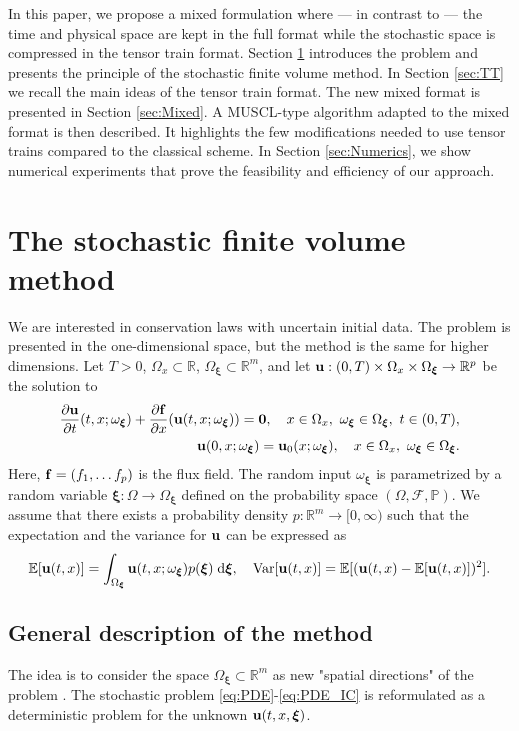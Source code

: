 \documentclass{article}
\newcommand{\bfu}{ {\bf u} }
\newcommand{\bfxi}{ {\bm \xi} }
\newcommand{\bff}{ {\bf f} }
\newcommand{\bfzero}{ {\bm 0} }
\newcommand{\R}{ \mathbb R }
\newcommand{\E}{ \mathbb E }
\newcommand{\diff}{ \; \text{d} }
\newcommand{\var}{ \text{Var} }
\begin{document}
In this paper, we propose a mixed formulation where --- in contrast to  \cite{walton_tensor-train_2024} ---  the time and physical space are kept in the full format while the stochastic space is compressed in the tensor train format.
Section \ref{sec:SFV} introduces the problem and presents the principle of the stochastic finite volume method.
In Section \ref{sec:TT} we recall the main ideas of the tensor train format.
The new mixed format is presented in Section \ref{sec:Mixed}.
A MUSCL-type algorithm adapted to the mixed format is then described. 
It highlights the few modifications needed to use tensor trains compared to the classical scheme.
In Section \ref{sec:Numerics}, we show numerical experiments that prove the feasibility and efficiency of our approach. 


\section{The stochastic finite volume method} \label{sec:SFV}
We are interested in conservation laws with uncertain initial data. 
The problem is presented in the one-dimensional space, but the method is the same for higher dimensions. 
Let $T>0$, $\Omega_x\subset\R$, $\Omega_\bfxi\subset\R^m$, 
and let $\bfu:(0,T)\times\Omega_x\times\Omega_\bfxi\to\mathbb{R}^p$ be the solution to 
\begin{align}  
    \label{eq:PDE}
    \frac{\partial \bfu }{\partial t}(t,x; \omega_\bfxi)
    + \frac{\partial \bff}{\partial x} (\bfu (t,x; \omega_\bfxi))
    = \bfzero, \quad x \in \Omega_x, \ \omega_\bfxi \in \Omega_\bfxi, \ t \in (0,T),
    \\
    \label{eq:PDE_IC}
    \bfu (0, x; \omega_\bfxi) = \bfu_0(x; \omega_\bfxi)
    , \quad x \in \Omega_x, \ \omega_\bfxi \in \Omega_\bfxi.
\end{align}
Here, $\bff = (f_1, \dots f_p)$ is the flux field. 
The random input $\omega_\bfxi$ is parametrized by a random variable $\bfxi:\Omega\to\Omega_\bfxi$ defined on the probability space 
$(\Omega, \mathcal F, \mathbb P)$.
We assume that there exists a probability density 
$p:\R^m\to[0,\infty)$ such that the expectation and the variance for $\bfu$ can be expressed as 
\begin{equation}
\E[\bfu(t,x)] = \int_{\Omega_\bfxi} \bfu(t,x ; \omega_\bfxi) p (\bfxi) \diff \bfxi, \quad
\var [\bfu(t,x)] = \E[(\bfu(t,x)-\E[\bfu(t,x)])^2].  
\end{equation}


\subsection{General description of the method}
The idea is to consider the space $\Omega_\bfxi\subset\R^m$ as new "spatial directions" of the problem \cite{jin_stochastic_2017}. 
The stochastic problem \eqref{eq:PDE}-\eqref{eq:PDE_IC} is reformulated as a deterministic problem for the unknown 
$\bfu(t,x,\bfxi)$. 
\end{document}
